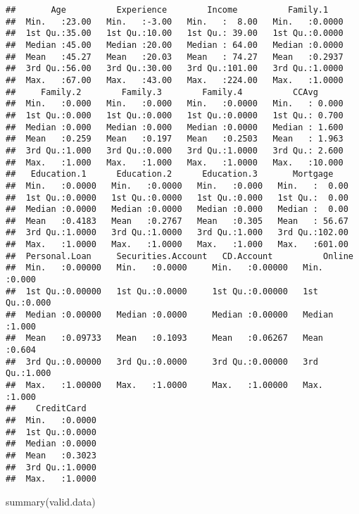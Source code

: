 \documentclass[
]{article}
\newenvironment{Shaded}{\begin{snugshade}}{\end{snugshade}}
\newcommand{\FunctionTok}[1]{\textcolor[rgb]{0.00,0.00,0.00}{#1}}
\newcommand{\NormalTok}[1]{#1}
\begin{document}
\begin{verbatim}
##       Age          Experience        Income          Family.1     
##  Min.   :23.00   Min.   :-3.00   Min.   :  8.00   Min.   :0.0000  
##  1st Qu.:35.00   1st Qu.:10.00   1st Qu.: 39.00   1st Qu.:0.0000  
##  Median :45.00   Median :20.00   Median : 64.00   Median :0.0000  
##  Mean   :45.27   Mean   :20.03   Mean   : 74.27   Mean   :0.2937  
##  3rd Qu.:56.00   3rd Qu.:30.00   3rd Qu.:101.00   3rd Qu.:1.0000  
##  Max.   :67.00   Max.   :43.00   Max.   :224.00   Max.   :1.0000  
##     Family.2        Family.3        Family.4          CCAvg       
##  Min.   :0.000   Min.   :0.000   Min.   :0.0000   Min.   : 0.000  
##  1st Qu.:0.000   1st Qu.:0.000   1st Qu.:0.0000   1st Qu.: 0.700  
##  Median :0.000   Median :0.000   Median :0.0000   Median : 1.600  
##  Mean   :0.259   Mean   :0.197   Mean   :0.2503   Mean   : 1.963  
##  3rd Qu.:1.000   3rd Qu.:0.000   3rd Qu.:1.0000   3rd Qu.: 2.600  
##  Max.   :1.000   Max.   :1.000   Max.   :1.0000   Max.   :10.000  
##   Education.1      Education.2      Education.3       Mortgage     
##  Min.   :0.0000   Min.   :0.0000   Min.   :0.000   Min.   :  0.00  
##  1st Qu.:0.0000   1st Qu.:0.0000   1st Qu.:0.000   1st Qu.:  0.00  
##  Median :0.0000   Median :0.0000   Median :0.000   Median :  0.00  
##  Mean   :0.4183   Mean   :0.2767   Mean   :0.305   Mean   : 56.67  
##  3rd Qu.:1.0000   3rd Qu.:1.0000   3rd Qu.:1.000   3rd Qu.:102.00  
##  Max.   :1.0000   Max.   :1.0000   Max.   :1.000   Max.   :601.00  
##  Personal.Loan     Securities.Account   CD.Account          Online     
##  Min.   :0.00000   Min.   :0.0000     Min.   :0.00000   Min.   :0.000  
##  1st Qu.:0.00000   1st Qu.:0.0000     1st Qu.:0.00000   1st Qu.:0.000  
##  Median :0.00000   Median :0.0000     Median :0.00000   Median :1.000  
##  Mean   :0.09733   Mean   :0.1093     Mean   :0.06267   Mean   :0.604  
##  3rd Qu.:0.00000   3rd Qu.:0.0000     3rd Qu.:0.00000   3rd Qu.:1.000  
##  Max.   :1.00000   Max.   :1.0000     Max.   :1.00000   Max.   :1.000  
##    CreditCard    
##  Min.   :0.0000  
##  1st Qu.:0.0000  
##  Median :0.0000  
##  Mean   :0.3023  
##  3rd Qu.:1.0000  
##  Max.   :1.0000
\end{verbatim}

\begin{Shaded}
\begin{Highlighting}[]
\FunctionTok{summary}\NormalTok{(valid.data)}
\end{Highlighting}
\end{Shaded}
\end{document}
